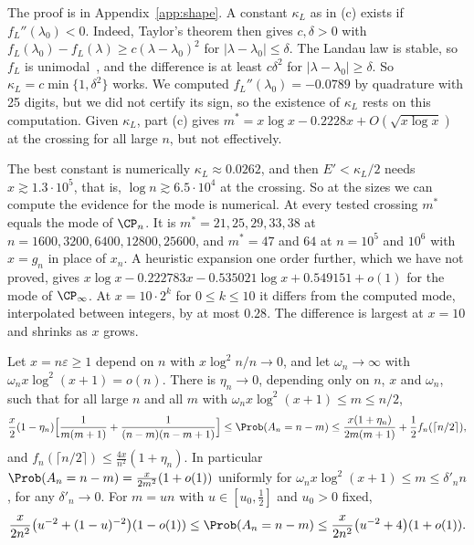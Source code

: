 The proof is in Appendix~\ref{app:shape}. A constant $\kappa_L$ as in (c)
exists if $f_L''(\lambda_0)<0$. Indeed, Taylor's theorem then gives
$c,\delta>0$ with $f_L(\lambda_0)-f_L(\lambda)\ge c(\lambda-\lambda_0)^2$ for
$\lvert\lambda-\lambda_0\rvert\le\delta$. The Landau law is stable, so $f_L$
is unimodal~\cite{yamazato1978}, and the difference is at least $c\delta^2$
for $\lvert\lambda-\lambda_0\rvert\ge\delta$. So $\kappa_L=c\min\{1,\delta^2\}$
works. We computed $f_L''(\lambda_0)=-0.0789$ by quadrature with 25 digits,
but we did not certify its sign, so the existence of $\kappa_L$ rests on
this computation. Given $\kappa_L$, part (c) gives
$m^*=x\log x-0.2228x+O(\sqrt{x\log x})$ at the crossing for all large $n$,
but not effectively.

The best constant is numerically
$\kappa_L\approx0.0262$, and then $E'<\kappa_L/2$ needs
$x\gtrsim1.3\cdot10^5$, that is, $\log n\gtrsim6.5\cdot10^4$ at the
crossing. So at the sizes we can compute the evidence for the mode is
numerical. At every tested crossing $m^*$ equals the mode of $\CP_n$. It is
$m^*=21,25,29,33,38$ at $n=1600,3200,6400,12800,25600$, and $m^*=47$ and
$64$ at $n=10^5$ and $10^6$ with $x=g_n$ in place of $x_n$. A heuristic
expansion one order further, which we have not proved, gives
$x\log x-0.222783x-0.535021\log x+0.549151+o(1)$ for the mode of
$\CP_\infty$. At $x=10\cdot2^k$ for $0\le k\le10$ it differs from the
computed mode, interpolated between integers, by at most $0.28$. The
difference is largest at $x=10$ and shrinks as $x$ grows.

\begin{theorem}\label{thm:profile}
Let $x=n\varepsilon\ge1$ depend on $n$ with $x\log^2n/n\to0$, and let
$\omega_n\to\infty$ with $\omega_nx\log^2(x+1)=o(n)$. There is $\eta_n\to0$,
depending only on $n$, $x$ and $\omega_n$, such that for all large $n$ and
all $m$ with $\omega_nx\log^2(x+1)\le m\le n/2$,
\[
 \frac x2(1-\eta_n)\Bigl[\frac1{m(m+1)}+\frac1{(n-m)(n-m+1)}\Bigr]
 \le\Prob(A_n=n-m)\le\frac{x(1+\eta_n)}{2m(m+1)}+\frac12f_n(\lceil n/2\rceil),
\]
and $f_n(\lceil n/2\rceil)\le\frac{4x}{n^2}(1+\eta_n)$. In particular
$\Prob(A_n=n-m)=\frac{x}{2m^2}(1+o(1))$ uniformly for
$\omega_nx\log^2(x+1)\le m\le\delta'_nn$, for any $\delta'_n\to0$. For
$m=un$ with $u\in[u_0,\frac12]$ and $u_0>0$ fixed,
\[
 \frac{x}{2n^2}\bigl(u^{-2}+(1-u)^{-2}\bigr)(1-o(1))\le\Prob(A_n=n-m)
 \le\frac{x}{2n^2}\bigl(u^{-2}+4\bigr)(1+o(1)).
\]
\end{theorem}

